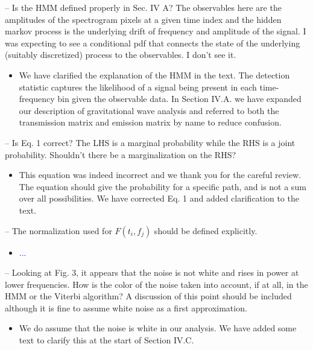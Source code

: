 \documentclass{article}
\newcommand{\todo}{\textcolor{blue}}
\begin{document}
\noindent
-- Is the HMM defined properly in Sec. IV A? The observables here are the amplitudes of the spectrogram pixels at a given time index and the hidden markov process is the underlying drift of frequency and amplitude of the signal. I was expecting to see a conditional pdf that connects the state of the underlying (suitably discretized) process to the observables. I don't see it.
\begin{itemize}
\item We have clarified the explanation of the HMM in the text. The detection statistic captures the likelihood of a signal being present in each time-frequency bin given the observable data. In Section IV.A. we have expanded our description of gravitational wave analysis and referred to both the transmission matrix and emission matrix by name to reduce confusion. 
\end{itemize}

\noindent
-- Is Eq. 1 correct? The LHS is a marginal probability while the RHS is a joint probability. Shouldn't there be a marginalization on the RHS?
\begin{itemize}
\item This equation was indeed incorrect and we thank you for the careful review. The equation should give the probability for a specific path, and is not a sum over all possibilities. We have corrected Eq. 1 and added clarification to the text. 
\end{itemize}

\noindent
-- The normalization used for $F(t_i, f_j)$ should be defined explicitly. 
\begin{itemize}
\item \todo{...}
\end{itemize}

\noindent
-- Looking at Fig. 3, it appears that the noise is not white and rises in power at lower frequencies. How is the color of the noise taken into account, if at all, in the HMM or the Viterbi algorithm? A discussion of this point should be included although it is fine to assume white noise as a first approximation. 
\begin{itemize}
\item We do assume that the noise is white in our analysis. We have added some text to clarify this at the start of Section IV.C.
\end{itemize}
\end{document}
